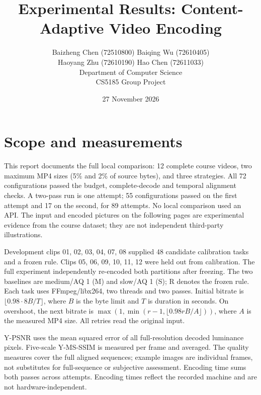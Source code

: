 \documentclass[10pt,a4paper]{article}
\title{Experimental Results: Content-Adaptive Video Encoding}
\author{Baizheng Chen (72510800) \quad Baiqing Wu (72610405) \\ Haoyang Zhu (72610190) \quad Hao Chen (72611033) \\ Department of Computer Science \\ CS5185 Group Project}
\date{27 November 2026}
\begin{document}
\maketitle
\section{Scope and measurements}
This report documents the full local comparison: 12 complete course videos, two maximum MP4 sizes (5\% and 2\% of source bytes), and three strategies. All 72 configurations passed the budget, complete-decode and temporal alignment checks. A two-pass run is one attempt; 55 configurations passed on the first attempt and 17 on the second, for 89 attempts. No local comparison used an API. The input and encoded pictures on the following pages are experimental evidence from the course dataset; they are not independent third-party illustrations.

Development clips 01, 02, 03, 04, 07, 08 supplied 48 candidate calibration tasks and a frozen rule. Clips 05, 06, 09, 10, 11, 12 were held out from calibration. The full experiment independently re-encoded both partitions after freezing. The two baselines are medium/AQ 1 (M) and slow/AQ 1 (S); R denotes the frozen rule. Each task uses FFmpeg/libx264, two threads and two passes. Initial bitrate is $\lfloor0.98\cdot8B/T\rfloor$, where $B$ is the byte limit and $T$ is duration in seconds. On overshoot, the next bitrate is $\max(1,\min(r-1,\lfloor0.98rB/A\rfloor))$, where $A$ is the measured MP4 size. All retries read the original input.

Y-PSNR uses the mean squared error of all full-resolution decoded luminance pixels. Five-scale Y-MS-SSIM is measured per frame and averaged. The quality measures cover the full aligned sequences; example images are individual frames, not substitutes for full-sequence or subjective assessment. Encoding time sums both passes across attempts. Encoding times reflect the recorded machine and are not hardware-independent.
\end{document}
